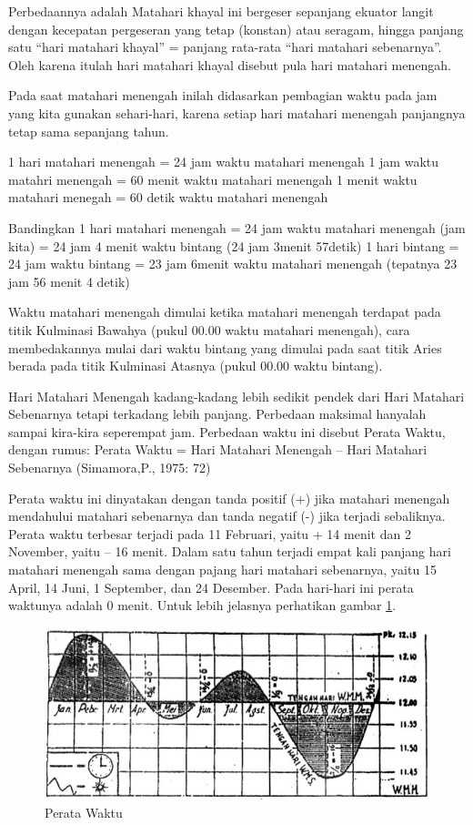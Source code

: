  Perbedaannya adalah Matahari khayal ini bergeser sepanjang ekuator langit 
 dengan kecepatan pergeseran yang tetap (konstan) atau seragam, hingga panjang satu
 “hari matahari khayal” = panjang rata-rata “hari matahari sebenarnya”. 
 Oleh karena itulah hari matahari khayal disebut pula hari matahari menengah.
 
  Pada saat matahari menengah inilah didasarkan pembagian waktu pada jam yang kita gunakan sehari-hari, karena setiap hari matahari menengah panjangnya tetap sama sepanjang tahun.

	1 hari matahari menengah = 24 jam waktu matahari menengah 
	1 jam waktu matahri menengah = 60 menit waktu matahari menengah
	1 menit waktu matahari menegah = 60 detik waktu matahari menengah
	
	Bandingkan
	1 hari matahari menengah = 24 jam waktu matahari menengah (jam kita)
							 = 24 jam 4 menit waktu bintang (24 jam 3menit 57detik)
	1 hari bintang		     = 24 jam waktu bintang
							 = 23 jam 6menit waktu matahari menengah 
							  (tepatnya 23 jam 56 menit 4 detik)
								  
Waktu matahari menengah dimulai ketika matahari menengah terdapat pada titik
 Kulminasi Bawahya (pukul 00.00 waktu matahari menengah), cara membedakannya mulai 
 dari waktu bintang yang dimulai pada saat titik Aries berada
 pada titik Kulminasi Atasnya (pukul 00.00 waktu bintang).


Hari Matahari Menengah kadang-kadang lebih sedikit pendek dari Hari Matahari 
 Sebenarnya tetapi terkadang lebih panjang.   Perbedaan maksimal hanyalah 
 sampai kira-kira seperempat jam. Perbedaan waktu ini disebut Perata Waktu, 
 dengan rumus:
				Perata Waktu = Hari Matahari Menengah – Hari Matahari Sebenarnya
							(Simamora,P., 1975: 72)
								
Perata waktu ini dinyatakan dengan tanda positif (+) jika 
 matahari menengah mendahului matahari sebenarnya dan tanda negatif (-)
 jika terjadi sebaliknya. Perata waktu terbesar terjadi pada 11 Februari,
 yaitu + 14 menit dan 2 November, yaitu – 16 menit. Dalam satu tahun terjadi 
 empat kali panjang hari matahari menengah sama dengan pajang hari matahari sebenarnya,
 yaitu 15 April, 14 Juni, 1 September, dan 24 Desember. Pada hari-hari ini perata 
 waktunya adalah 0 menit.  Untuk lebih jelasnya perhatikan gambar \ref{sejarahwaktu_Capture}.								
	
	\begin{figure}[ht]
	\centerline{\includegraphics[width=1\textwidth]{figures/sejarahwaktu_peratawaktu}}
	\caption{Perata Waktu}
	\label{sejarahwaktu_Capture}
	\end{figure}

